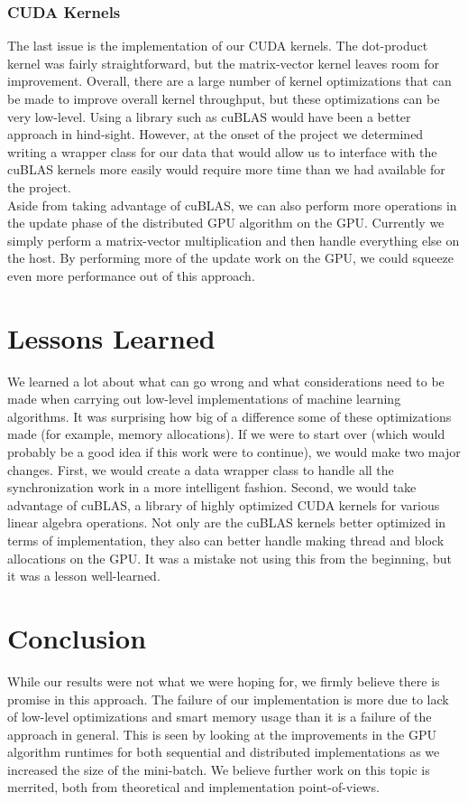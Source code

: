 \documentclass{article}
\begin{document}
\subsubsection{CUDA Kernels}
The last issue is the implementation of our CUDA kernels. The dot-product
kernel was fairly straightforward, but the matrix-vector kernel leaves room for
improvement. Overall, there are a large number of kernel optimizations that can
be made to improve overall kernel throughput, but these optimizations can be
very low-level. Using a library such as cuBLAS would have been a better
approach in hind-sight. However, at the onset of the project we determined
writing a wrapper class for our data that would allow us to interface with the
cuBLAS kernels more easily would require more time than we had available for
the project.\\

Aside from taking advantage of cuBLAS, we can also perform more operations in
the update phase of the distributed GPU algorithm on the GPU. Currently we
simply perform a matrix-vector multiplication and then handle everything else on
the host. By performing more of the update work on the GPU, we could squeeze
even more performance out of this approach.

\section{Lessons Learned}
We learned a lot about what can go wrong and what considerations need to be
made when carrying out low-level implementations of machine learning
algorithms. It was surprising how big of a difference some of these
optimizations made (for example, memory allocations). If we were to start over
(which would probably be a good idea if this work were to continue), we would
make two major changes. First, we would create a data wrapper class to handle
all the synchronization work in a more intelligent fashion. Second, we would
take advantage of cuBLAS, a library of highly optimized CUDA kernels for
various linear algebra operations. Not only are the cuBLAS kernels better
optimized in terms of implementation, they also can better handle making thread
and block allocations on the GPU. It was a mistake not using this from the
beginning, but it was a lesson well-learned.

\section{Conclusion}
While our results were not what we were hoping for, we firmly believe there is
promise in this approach. The failure of our implementation is more due to lack
of low-level optimizations and smart memory usage than it is a failure of the
approach in general. This is seen by looking at the improvements in the GPU
algorithm runtimes for both sequential and distributed implementations as we
increased the size of the mini-batch. We believe further work on this topic is
merrited, both from theoretical and implementation point-of-views.
\end{document}
